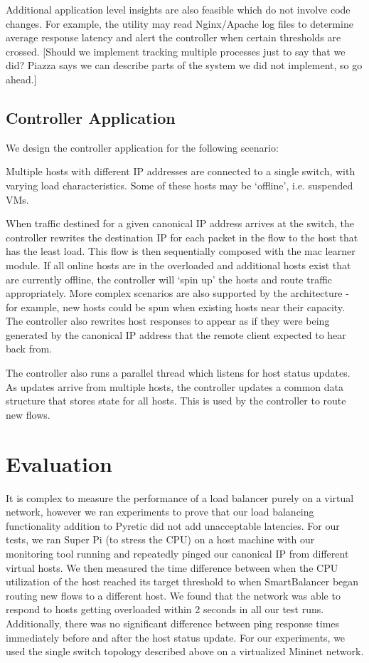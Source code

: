 \documentclass[10pt]{article}
\begin{document}
Additional application level insights are also feasible which do not involve code changes. For example, the utility may read Nginx/Apache log files to determine average response latency and alert the controller when certain thresholds are crossed.
[Should we implement tracking multiple processes just to say that we did? Piazza says we can describe parts of the system we did not implement, so go ahead.]

\subsection{Controller Application}

We design the controller application for the following scenario:

Multiple hosts with different IP addresses are connected to a single switch, with varying load characteristics. Some of these hosts may be ‘offline’, i.e. suspended VMs.

When traffic destined for a given canonical IP address arrives at the switch, the controller rewrites the destination IP for each packet in the flow to the host that has the least load. This flow is then sequentially composed with the mac learner module. If all online hosts are in the overloaded and additional hosts exist that are currently offline, the controller will ‘spin up’ the hosts and route traffic appropriately. More complex scenarios are also supported by the architecture - for example, new hosts could be spun when existing hosts near their capacity. The controller also rewrites host responses to appear as if they were being generated by the canonical IP address that the remote client expected to hear back from.

The controller also runs a parallel thread which listens for host status updates. As updates arrive from multiple hosts, the controller updates a common data structure that stores state for all hosts. This is used by the controller to route new flows.

\section{Evaluation}

It is complex to measure the performance of a load balancer purely on a virtual network, however we ran experiments to prove that our load balancing functionality addition to Pyretic did not add unacceptable latencies. For our tests, we ran Super Pi (to stress the CPU) on a host machine with our monitoring tool running and repeatedly pinged our canonical IP from different virtual hosts. We then measured the time difference between when the CPU utilization of the host reached its target threshold to when SmartBalancer began routing new flows to a different host. We found that the network was able to respond to hosts getting overloaded within 2 seconds in all our test runs. Additionally, there was no significant difference between ping response times immediately before and after the host status update. For our experiments, we used the single switch topology described above on a virtualized Mininet network.
\end{document}
